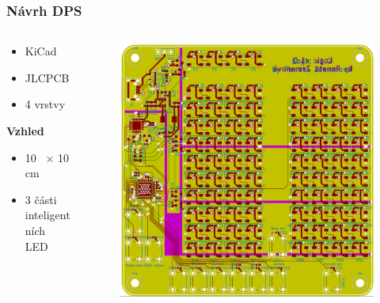 \documentclass[%
  12pt,       				%
	t,                  %
	aspectratio=1610,   %
	unicode,						%
]{beamer}				    	%
\begin{document}
\begin{frame} 
	\frametitle{Návrh DPS}
		\begin{columns}[T] 	
		\begin{column}{0.4\textwidth}		%
			\vspace{0.5cm}
			\begin{itemize}
				\item KiCad
				\item JLCPCB
				\item 4 vrstvy
			\end{itemize}
			\vspace{0.5cm}
			\textbf{Vzhled}
			\begin{itemize}
				\item 10 ~$\times$ 10 cm
				\item 3 části inteligentních LED
			\end{itemize}
		\end{column}

		\begin{column}{0.6\textwidth}		%
			\begin{figure}%
				\centering
				\includegraphics[width=0.8\columnwidth]{prilohy/Verze1_DPS_cela.png}
			\end{figure}%
		\end{column}
	\end{columns}
\end{frame}
\end{document}

